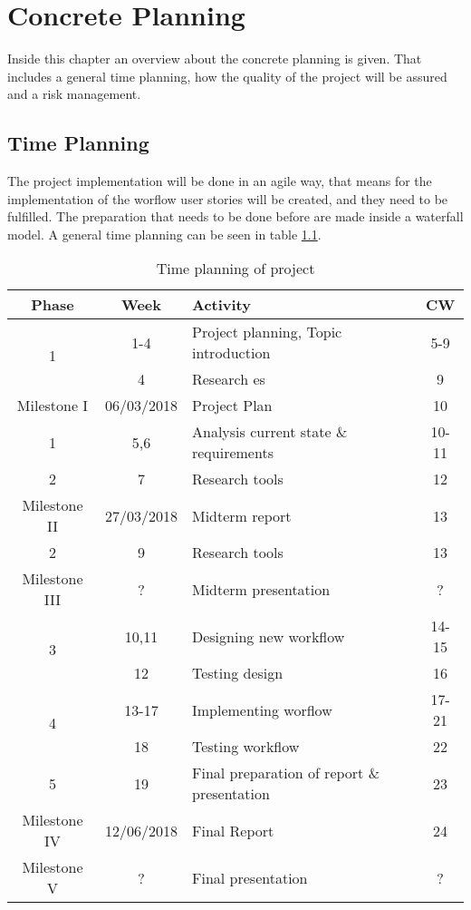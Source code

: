 \chapter{Concrete Planning}
Inside this chapter an overview about the concrete planning is given. That includes a general time planning, how the quality of the project will be assured and a risk management.

\section{Time Planning}
The project implementation will be done in an agile way, that means for the implementation of the worflow user stories will be created, and they need to be fulfilled. The preparation that needs to be done before are made inside a waterfall model. A general time planning can be seen in table \ref{tab:timeplanning}. 
\begin{table} [h]
	\begin{tabular}{|c|c|l|c|} \hline
		Phase & Week & Activity & CW \\ \hline
		\multirow{2}{*}{1} & 1-4 & Project planning, Topic introduction & 5-9 \\
										& 4 & Research \gls{es} & 9 \\	\hline	
		Milestone I & 06/03/2018 & Project Plan & 10\\ \hline
		1 & 5,6 & Analysis current state \& requirements & 10-11  \\ \hline
		2 & 7 & Research tools & 12 \\ \hline
		Milestone II & 27/03/2018 & Midterm report & 13\\ \hline
		2 & 9 & Research tools & 13 \\ \hline
		Milestone III & ? & Midterm presentation & ? \\ \hline
		\multirow{2}{*}{3} & 10,11 & Designing new workflow & 14-15 \\
						   & 12 & Testing design & 16 \\ \hline
		\multirow{2}{*}{4} & 13-17 & Implementing worflow & 17-21 \\
						   & 18 & Testing workflow & 22 \\ \hline
		5 & 19 & Final preparation of report \& presentation & 23 \\ \hline
		Milestone IV & 12/06/2018 & Final Report & 24\\ \hline
		Milestone V & ? & Final presentation & ? \\ \hline
	\end{tabular}
	\caption{Time planning of project}
	\label{tab:timeplanning}
\end{table}

